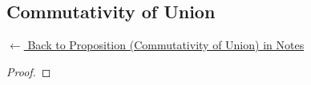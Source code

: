 
\subsection*{Commutativity of Union}
\label{prf:comm-union}

\begin{remark*}[Return]
\hyperref[prop:comm-union]{$\leftarrow$ Back to Proposition (Commutativity of Union) in Notes}
\end{remark*}

\begin{proof}
\end{proof}

\begin{remark*}

\end{remark*}

\begin{remark*}[Dependencies]

\FlashUses{}
\end{remark*}
